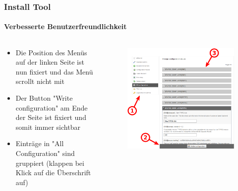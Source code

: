
\begin{frame}[fragile]
	\frametitle{Install Tool}
	\framesubtitle{Verbesserte Benutzerfreundlichkeit}

	\begin{columns}[T]
		\begin{column}{.5\textwidth}

			\begin{itemize}
				\item Die Position des Menüs auf der linken Seite ist nun fixiert und das Menü scrollt nicht mit
				\item Der Button "Write configuration" am Ende der Seite ist fixiert und somit immer sichtbar
				\item Einträge in "All Configuration" sind gruppiert (klappen bei Klick auf die Überschrift auf)
			\end{itemize}

		\end{column}
		\begin{column}{.5\textwidth}

			\begin{figure}\vspace*{-0.4cm}
				\includegraphics[width=0.8\linewidth]{Images/InstallTool/ImprovedUsability.png}
			\end{figure}

		\end{column}
	\end{columns}

\end{frame}


